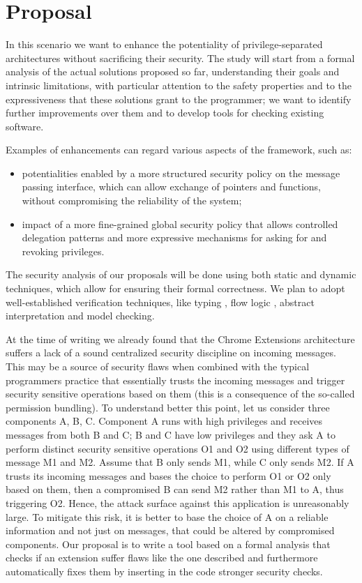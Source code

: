 \documentclass[10pt,a4paper]{article}
\begin{document}
\section*{Proposal}
In this scenario we want to enhance the potentiality of privilege-separated architectures without sacrificing their security. The study will start from a formal analysis of the actual solutions proposed so far, understanding their goals and intrinsic limitations, with particular attention to the safety properties and to the expressiveness that these solutions grant to the programmer; we want to identify further improvements over them and to develop tools for checking existing software.

Examples of enhancements can regard various aspects of the framework, such as:
\begin{itemize}
\item potentialities enabled by a more structured security policy on the message passing interface, which can allow exchange of pointers and functions, without compromising the reliability of the system;
\item impact of a more fine-grained global security policy that allows controlled delegation patterns and more expressive mechanisms for asking for and revoking privileges.
\end{itemize}
The security analysis of our proposals will be done using both static and dynamic techniques, which allow for ensuring their formal correctness. We plan to adopt well-established verification techniques, like typing \cite{Strobe}, flow logic \cite{FlowLogic,CarmelFlowLogicFormalization,PrincipleProgramAnalysis}, abstract interpretation \cite{StringAbstraction,LambdaJSMightVanHorn,TAJS,TAJSDOM} and model checking.

At the time of writing we already found that the Chrome Extensions architecture suffers a lack of a sound centralized security discipline on incoming messages. This may be a source of security flaws when combined with the typical programmers practice that essentially trusts the incoming messages and trigger security sensitive operations based on them (this is a consequence of the so-called permission bundling). To understand better this point, let us consider three components A, B, C. Component A runs with high privileges and receives messages from both B and C; B and C have low privileges and they ask A to perform distinct security sensitive operations O1 and O2 using different types of message M1 and M2. Assume that B only sends M1, while C only sends M2. If A trusts its incoming messages and bases the choice to perform O1 or O2 only based on them, then a compromised B can send M2 rather than M1 to A, thus triggering O2. Hence, the attack surface against this application is unreasonably large. To mitigate this risk, it is better to base the choice of A on a reliable information and not just on messages, that could be altered by compromised components. Our proposal is to write a tool based on a formal analysis that checks if an extension suffer flaws like the one described and furthermore automatically fixes them by inserting in the code stronger security checks. 



\end{document}
